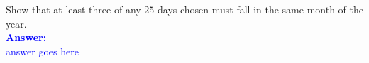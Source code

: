 \item{}
Show that at least three of any $25$ days chosen must fall in the same month of
the year.\\[12pt]
\ifanswers
\textcolor{blue}{
\textbf{Answer:}\\[6pt]
answer goes here
}
\newpage
\fi
